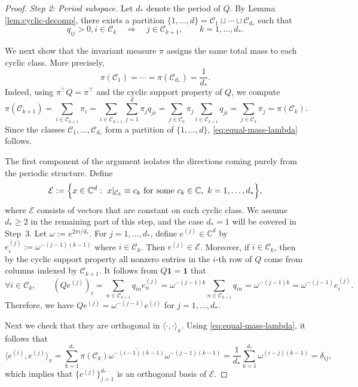 \documentclass[11pt,twoside, a4paper]{article}
\numberwithin{equation}{section}
\numberwithin{figure}{section}
\theoremstyle{plain} %
\theoremstyle{definition}
\theoremstyle{remark}
\newcommand{\1} {\mspace{1 mu}}
\newcommand{\2} {\mspace{2 mu}}
\newcommand{\C} {{\mathbb{C}}}
\begin{document}
\begin{proof}
\medskip
\noindent\textit{Step 2: Period subspace.}
Let \(d_*\) denote the period of \(Q\). By Lemma \ref{lem:cyclic-decomp}, there exists a partition
$
\{1,\dots,d\}=\mathcal{C}_1\sqcup\cdots\sqcup \mathcal{C}_{d_*}
$
such that
\[
q_{ij}>0, i\in \mathcal{C}_k
\quad\Longrightarrow\quad
j\in \mathcal{C}_{k+1},
\qquad k=1,\dots,d_*.
\]

We next show that the invariant measure \(\pi\) assigns the same total mass to each cyclic class. More precisely,
\begin{equation}\label{eq:equal-mass-lambda}
\pi(\mathcal{C}_1)=\cdots=\pi(\mathcal{C}_{d_*})=\frac1{d_*}.
\end{equation}
Indeed, using \(\pi^\top Q=\pi^\top\) and the cyclic support property of \(Q\), we compute
\[
\pi(\mathcal{C}_{k+1})
=
\sum_{i\in \mathcal{C}_{k+1}}\pi_i
=
\sum_{i\in \mathcal{C}_{k+1}}\sum_{j=1}^d \pi_j q_{ji}
=
\sum_{j\in \mathcal{C}_{k}}\pi_j \sum_{i\in \mathcal{C}_{k+1}}q_{ji}
=
\sum_{j\in \mathcal{C}_{k}}\pi_j
=
\pi(\mathcal{C}_{k}).
\]
Since the classes \(\mathcal{C}_1,\dots,\mathcal{C}_{d_*}\) form a partition of \(\{1,\dots,d\}\), \eqref{eq:equal-mass-lambda} follows.

\medskip
The first component of the argument isolates the directions coming purely from the periodic structure. Define
\begin{equation}\label{def.G}
  \mathcal E:=\Bigl\{x\in \C^d:\ x|_{\mathcal{C}_{k}}\equiv c_{k} \text{ for some }c_{k}\in \C,\ k=1,\dots,d_*\Bigr\},
\end{equation}
where \(\mathcal E\) consists of vectors that are constant on each cyclic class. 
We assume $d_*\ge 2$ in the remaining part of this step, and the case \(d_*=1\) will be covered in Step~3.
Let $\omega:=e^{2\pi i/d_*}.$
For \(j=1,\dots,d_*\), define \(e^{(j)}\in \C^d\) by
$
e^{(j)}_i:=\omega^{-(j-1)(k-1)}$
where $i\in \mathcal{C}_{k}$.
Then \(e^{(j)}\in \mathcal E\). Moreover, if \(i\in \mathcal{C}_{k}\), then by the cyclic support property all nonzero entries in the \(i\)-th row of \(Q\) come from columns indexed by \(\mathcal{C}_{k+1}\). It follows from \(Q\mathbf 1=\mathbf 1\) that
\[
\forall i\in\mathcal{C}_k,\qquad
(Qe^{(j)})_i
=
\sum_{n\in \mathcal{C}_{k+1}} q_{in} e^{(j)}_n
=
\omega^{-(j-1)k}\sum_{n\in \mathcal{C}_{k+1}}q_{in}
=
\omega^{-(j-1)k}
=
\omega^{-(j-1)} e^{(j)}_i.
\]
Therefore, we have 
$
Qe^{(j)}=\omega^{-(j-1)} e^{(j)}$ for  $j=1,\dots,d_*
$.

Next we check that they are orthogonal in $\langle\cdot,\cdot\rangle_\pi$. Using \eqref{eq:equal-mass-lambda}, it follows that
\[
\langle e^{(i)},e^{(j)}\rangle_\pi
=
\sum_{k=1}^{d_*} \pi(\mathcal{C}_{k})\overline{\omega^{-(i-1)(k-1)}}\omega^{-(j-1)(k-1)}
=
\frac1{d_*}\sum_{k=1}^{d_*} \omega^{(i-j)(k-1)}=\delta_{ij},
\]
which implies that \(\{e^{(j)}\}_{j=1}^{d_*}\) is an orthogonal basis of \(\mathcal E\). 


\end{proof}
\end{document}

